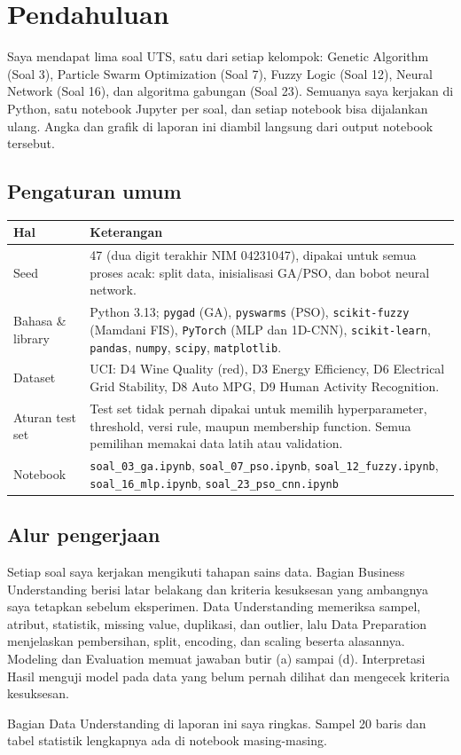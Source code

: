 \section{Pendahuluan}

Saya mendapat lima soal UTS, satu dari setiap kelompok: Genetic Algorithm (Soal 3), Particle Swarm Optimization (Soal 7), Fuzzy Logic (Soal 12), Neural Network (Soal 16), dan algoritma gabungan (Soal 23). Semuanya saya kerjakan di Python, satu notebook Jupyter per soal, dan setiap notebook bisa dijalankan ulang. Angka dan grafik di laporan ini diambil langsung dari output notebook tersebut.

\subsection*{Pengaturan umum}
\begin{tabularx}{\textwidth}{@{}lL@{}}
\toprule
\textbf{Hal} & \textbf{Keterangan} \\
\midrule
Seed & 47 (dua digit terakhir NIM 04231047), dipakai untuk semua proses acak: split data, inisialisasi GA/PSO, dan bobot neural network. \\
Bahasa \& library & Python 3.13; \texttt{pygad} (GA), \texttt{pyswarms} (PSO), \texttt{scikit-fuzzy} (Mamdani FIS), \texttt{PyTorch} (MLP dan 1D-CNN), \texttt{scikit-learn}, \texttt{pandas}, \texttt{numpy}, \texttt{scipy}, \texttt{matplotlib}. \\
Dataset & UCI: D4 Wine Quality (red), D3 Energy Efficiency, D6 Electrical Grid Stability, D8 Auto MPG, D9 Human Activity Recognition. \\
Aturan test set & Test set tidak pernah dipakai untuk memilih hyperparameter, threshold, versi rule, maupun membership function. Semua pemilihan memakai data latih atau validation. \\
Notebook & \texttt{soal\_03\_ga.ipynb}, \texttt{soal\_07\_pso.ipynb}, \texttt{soal\_12\_fuzzy.ipynb}, \texttt{soal\_16\_mlp.ipynb}, \texttt{soal\_23\_pso\_cnn.ipynb} \\
\bottomrule
\end{tabularx}

\subsection*{Alur pengerjaan}
Setiap soal saya kerjakan mengikuti tahapan sains data. Bagian Business Understanding berisi latar belakang dan kriteria kesuksesan yang ambangnya saya tetapkan sebelum eksperimen. Data Understanding memeriksa sampel, atribut, statistik, missing value, duplikasi, dan outlier, lalu Data Preparation menjelaskan pembersihan, split, encoding, dan scaling beserta alasannya. Modeling dan Evaluation memuat jawaban butir (a) sampai (d). Interpretasi Hasil menguji model pada data yang belum pernah dilihat dan mengecek kriteria kesuksesan.

Bagian Data Understanding di laporan ini saya ringkas. Sampel 20 baris dan tabel statistik lengkapnya ada di notebook masing-masing.
